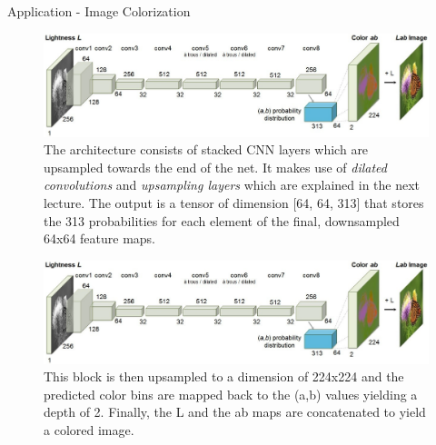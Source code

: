 \begin{vbframe}{Application - Image Colorization}
\begin{figure}
            \end{figure}
            \framebreak
            \begin{figure}
            \centering
            \includegraphics[width=11.5cm]{plots/application/color_architecture.png}
            \caption{The architecture consists of stacked CNN layers which are upsampled towards the end of the net. It makes use of \textit{dilated convolutions} and \textit{upsampling layers} which are explained in the next lecture. The output is a tensor of dimension [64, 64, 313] that stores the 313 probabilities for each element of the final, downsampled 64x64 feature maps.} 
            \end{figure}
            \framebreak
            \begin{figure}
            \centering
            \includegraphics[width=11.5cm]{plots/application/color_architecture.png}
            \caption{This block is then upsampled to a dimension of 224x224 and the predicted color bins are mapped back to the (a,b) values yielding a depth of 2. Finally, the L and the ab maps are concatenated to yield a colored image.} 
            \end{figure}
            \end{vbframe}
